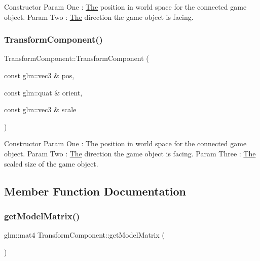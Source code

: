 Constructor Param One \+: \mbox{\hyperlink{class_the}{The}} position in world space for the connected game object. Param Two \+: \mbox{\hyperlink{class_the}{The}} direction the game object is facing. \mbox{\label{class_transform_component_aa823162adc73870484409dcdb8cc95f3}} 
\subsubsection{\texorpdfstring{Transform\+Component()}{TransformComponent()}\hspace{0.1cm}{\footnotesize\ttfamily [4/4]}}
{\footnotesize\ttfamily Transform\+Component\+::\+Transform\+Component (\begin{DoxyParamCaption}\item[{const glm\+::vec3 \&}]{pos,  }\item[{const glm\+::quat \&}]{orient,  }\item[{const glm\+::vec3 \&}]{scale }\end{DoxyParamCaption})\hspace{0.3cm}{\ttfamily [inline]}}

Constructor Param One \+: \mbox{\hyperlink{class_the}{The}} position in world space for the connected game object. Param Two \+: \mbox{\hyperlink{class_the}{The}} direction the game object is facing. Param Three \+: \mbox{\hyperlink{class_the}{The}} scaled size of the game object. 

\subsection{Member Function Documentation}
\mbox{\label{class_transform_component_a5fc531fdaba497dfb2013edce34cb094}} 
\subsubsection{\texorpdfstring{get\+Model\+Matrix()}{getModelMatrix()}}
{\footnotesize\ttfamily glm\+::mat4 Transform\+Component\+::get\+Model\+Matrix (\begin{DoxyParamCaption}{ }\end{DoxyParamCaption})\hspace{0.3cm}{\ttfamily [inline]}}

